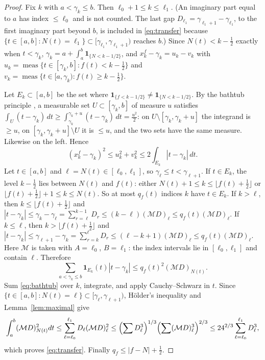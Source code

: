 \documentclass[11pt,a4paper]{article}
\makeatletter
\numberwithin{equation}{section}
\DeclareRobustCommand{\CGref}[1]{\ref{#1}}
\DeclareRobustCommand{\CGeqref}[1]{\eqref{#1}}
\DeclareRobustCommand{\CGcite}[2][]{\if\relax\detokenize{#1}\relax\cite{#2}\else\cite[#1]{#2}\fi}
\let\CG@origref\ref
\let\CG@origeqref\eqref
\newcommand{\CG@gettip}[1]{\@ifundefined{CGTip@#1}{#1}{\csname CGTip@#1\endcsname}}
\newcommand{\CG@getbib}[1]{\@ifundefined{CGBib@#1}{#1}{\csname CGBib@#1\endcsname}}
\DeclareRobustCommand{\CGref}[1]{\pdftooltip{\CG@origref{#1}}{\CG@gettip{#1}}}
\DeclareRobustCommand{\CGeqref}[1]{\pdftooltip{\CG@origeqref{#1}}{\CG@gettip{#1}}}
\DeclareRobustCommand{\CGcite}[2][]{\pdftooltip{\if\relax\detokenize{#1}\relax\cite{#2}\else\cite[#1]{#2}\fi}{\CG@getbib{#2}}}
\theoremstyle{definition}
\theoremstyle{remark}
\newcommand{\M}{\mathcal M}
\newcommand{\Ind}{\mathbf 1}
\newcommand{\meas}{\operatorname{meas}}
\makeatother
\begin{document}
\begin{proof}
Fix $k$ with $a<\gamma_k\le b$. Then $\ell_0+1\le k\le\ell_1$. (An imaginary part equal to $a$ has index $\le\ell_0$ and is not counted. The last gap $D_{\ell_1}=\gamma_{\ell_1+1}-\gamma_{\ell_1}$, to the first imaginary part beyond $b$, is included in \CGeqref{eq:transfer} because $\{t\in[a,b]:N(t)=\ell_1\}\subset[\gamma_{\ell_1},\gamma_{\ell_1+1})$ reaches $b$.) Since $N(t)<k-\frac12$ exactly when $t<\gamma_k$, $\gamma_k=a+\int_a^b\Ind_{\{N<k-1/2\}}$, and $x^f_k-\gamma_k=u_k-v_k$ with $u_k=\meas\{t\in[\gamma_k,b]:f(t)<k-\frac12\}$ and $v_k=\meas\{t\in[a,\gamma_k):f(t)\ge k-\frac12\}$.

Let $E_k\subset[a,b]$ be the set where $\Ind_{\{f<k-1/2\}}\ne\Ind_{\{N<k-1/2\}}$. By the bathtub principle \CGcite[Thm.~1.14]{LiebLoss2001}, a measurable set $U\subset[\gamma_k,b]$ of measure $u$ satisfies $\int_U(t-\gamma_k)\,dt\ge\int_{\gamma_k}^{\gamma_k+u}(t-\gamma_k)\,dt=\frac{u^2}2$: on $U\setminus[\gamma_k,\gamma_k+u]$ the integrand is $\ge u$, on $[\gamma_k,\gamma_k+u]\setminus U$ it is $\le u$, and the two sets have the same measure. Likewise on the left. Hence
\begin{equation}
(x^f_k-\gamma_k)^2\le u_k^2+v_k^2\le2\int_{E_k}|t-\gamma_k|\,dt .
\label{eq:bathtub}
\end{equation}
Let $t\in[a,b]$ and $\ell=N(t)\in[\ell_0,\ell_1]$, so $\gamma_\ell\le t<\gamma_{\ell+1}$. If $t\in E_k$, the level $k-\frac12$ lies between $N(t)$ and $f(t)$: either $N(t)+1\le k\le\lfloor f(t)+\frac12\rfloor$ or $\lfloor f(t)+\frac12\rfloor+1\le k\le N(t)$. So at most $q_f(t)$ indices $k$ have $t\in E_k$. If $k>\ell$, then $k\le\lfloor f(t)+\frac12\rfloor$ and $|t-\gamma_k|\le\gamma_k-\gamma_\ell=\sum_{r=\ell}^{k-1}D_r\le(k-\ell)(\M D)_\ell\le q_f(t)(\M D)_\ell$. If $k\le\ell$, then $k>\lfloor f(t)+\frac12\rfloor$ and $|t-\gamma_k|\le\gamma_{\ell+1}-\gamma_k=\sum_{r=k}^{\ell}D_r\le(\ell-k+1)(\M D)_\ell\le q_f(t)(\M D)_\ell$. Here $\M$ is taken with $A=\ell_0$, $B=\ell_1$: the index intervals lie in $[\ell_0,\ell_1]$ and contain $\ell$. Therefore
\begin{equation}
\sum_{a<\gamma_k\le b}\Ind_{E_k}(t)|t-\gamma_k|\le q_f(t)^2(\M D)_{N(t)} .
\label{eq:disp_22}
\end{equation}
Sum \CGeqref{eq:bathtub} over $k$, integrate, and apply Cauchy--Schwarz in $t$. Since $\{t\in[a,b]:N(t)=\ell\}\subset[\gamma_\ell,\gamma_{\ell+1})$, H\"older's inequality and Lemma~\CGref{lem:maximal} give
\begin{equation}
\int_a^b(\M D)_{N(t)}^2dt\le\sum_{\ell=\ell_0}^{\ell_1}D_\ell(\M D)_\ell^2\le\Bigl(\sum D_\ell^3\Bigr)^{1/3}\Bigl(\sum(\M D)_\ell^3\Bigr)^{2/3}\le24^{2/3}\sum_{\ell=\ell_0}^{\ell_1}D_\ell^3 ,
\label{eq:disp_23}
\end{equation}
which proves \CGeqref{eq:transfer}. Finally $q_f\le|f-N|+\frac12$.
\end{proof}
\end{document}

